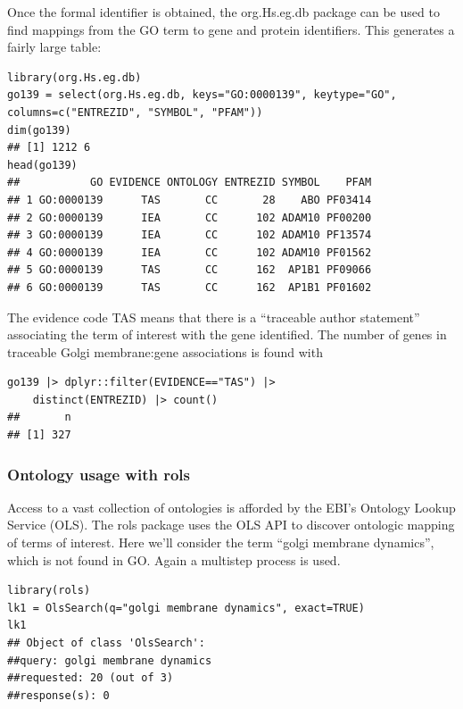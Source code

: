 \documentclass[graybox]{svmult}
\begin{document}
Once the formal identifier is obtained, the org.Hs.eg.db package can be used to find mappings
from the GO term to gene and protein identifiers. This generates a fairly large table:

\begin{shaded}
\begin{verbatim}
library(org.Hs.eg.db)
go139 = select(org.Hs.eg.db, keys="GO:0000139", keytype="GO",
columns=c("ENTREZID", "SYMBOL", "PFAM"))
dim(go139)
## [1] 1212 6
head(go139)
##           GO EVIDENCE ONTOLOGY ENTREZID SYMBOL    PFAM
## 1 GO:0000139      TAS       CC       28    ABO PF03414
## 2 GO:0000139      IEA       CC      102 ADAM10 PF00200
## 3 GO:0000139      IEA       CC      102 ADAM10 PF13574
## 4 GO:0000139      IEA       CC      102 ADAM10 PF01562
## 5 GO:0000139      TAS       CC      162  AP1B1 PF09066
## 6 GO:0000139      TAS       CC      162  AP1B1 PF01602
\end{verbatim}
\end{shaded}

The evidence code TAS means that there is a ``traceable author statement'' associating the term
of interest with the gene identified. The number of genes in traceable Golgi membrane:gene
associations is found with

\begin{shaded}
\begin{verbatim}
go139 |> dplyr::filter(EVIDENCE=="TAS") |> 
    distinct(ENTREZID) |> count()
##       n
## [1] 327
\end{verbatim}
\end{shaded}


\subsubsection{Ontology usage with rols}\label{ontology-usage-with-rols}

Access to a vast collection of ontologies is afforded by the EBI's
Ontology Lookup Service (OLS). The rols package uses the OLS API
to discover ontologic mapping of terms of interest. Here we'll
consider the term ``golgi membrane dynamics'', which is not found in GO.
Again a multistep process is used.

\begin{shaded}
\begin{verbatim}
library(rols)
lk1 = OlsSearch(q="golgi membrane dynamics", exact=TRUE)
lk1
## Object of class 'OlsSearch':
##query: golgi membrane dynamics
##requested: 20 (out of 3)
##response(s): 0
\end{verbatim}
\end{shaded}
\end{document}
